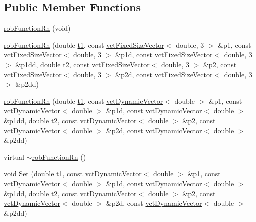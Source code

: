 \subsection*{Public Member Functions}
\begin{DoxyCompactItemize}
\item 
\hyperlink{classrob_function_rn_a44ee7bf0be512aafc162224b1c36e01f}{rob\-Function\-Rn} (void)
\item 
\hyperlink{classrob_function_rn_ac2d173943adbf50617077a352072b8a7}{rob\-Function\-Rn} (double \hyperlink{classrob_function_a9a4b408a3a5a8ae927caec3b6bac36ef}{t1}, const \hyperlink{classvct_fixed_size_vector}{vct\-Fixed\-Size\-Vector}$<$ double, 3 $>$ \&p1, const \hyperlink{classvct_fixed_size_vector}{vct\-Fixed\-Size\-Vector}$<$ double, 3 $>$ \&p1d, const \hyperlink{classvct_fixed_size_vector}{vct\-Fixed\-Size\-Vector}$<$ double, 3 $>$ \&p1dd, double \hyperlink{classrob_function_abf15c2d695ab4cc6336e19862327858f}{t2}, const \hyperlink{classvct_fixed_size_vector}{vct\-Fixed\-Size\-Vector}$<$ double, 3 $>$ \&p2, const \hyperlink{classvct_fixed_size_vector}{vct\-Fixed\-Size\-Vector}$<$ double, 3 $>$ \&p2d, const \hyperlink{classvct_fixed_size_vector}{vct\-Fixed\-Size\-Vector}$<$ double, 3 $>$ \&p2dd)
\item 
\hyperlink{classrob_function_rn_a99dc46624e4e38ac5eb6c27b71f6d821}{rob\-Function\-Rn} (double \hyperlink{classrob_function_a9a4b408a3a5a8ae927caec3b6bac36ef}{t1}, const \hyperlink{classvct_dynamic_vector}{vct\-Dynamic\-Vector}$<$ double $>$ \&p1, const \hyperlink{classvct_dynamic_vector}{vct\-Dynamic\-Vector}$<$ double $>$ \&p1d, const \hyperlink{classvct_dynamic_vector}{vct\-Dynamic\-Vector}$<$ double $>$ \&p1dd, double \hyperlink{classrob_function_abf15c2d695ab4cc6336e19862327858f}{t2}, const \hyperlink{classvct_dynamic_vector}{vct\-Dynamic\-Vector}$<$ double $>$ \&p2, const \hyperlink{classvct_dynamic_vector}{vct\-Dynamic\-Vector}$<$ double $>$ \&p2d, const \hyperlink{classvct_dynamic_vector}{vct\-Dynamic\-Vector}$<$ double $>$ \&p2dd)
\item 
virtual \hyperlink{classrob_function_rn_af8b8ae888a0c3a26afcb3bf2a3d5085f}{$\sim$rob\-Function\-Rn} ()
\item 
void \hyperlink{classrob_function_rn_ad7d1b47734c628597add8ec764f91f47}{Set} (double \hyperlink{classrob_function_a9a4b408a3a5a8ae927caec3b6bac36ef}{t1}, const \hyperlink{classvct_dynamic_vector}{vct\-Dynamic\-Vector}$<$ double $>$ \&p1, const \hyperlink{classvct_dynamic_vector}{vct\-Dynamic\-Vector}$<$ double $>$ \&p1d, const \hyperlink{classvct_dynamic_vector}{vct\-Dynamic\-Vector}$<$ double $>$ \&p1dd, double \hyperlink{classrob_function_abf15c2d695ab4cc6336e19862327858f}{t2}, const \hyperlink{classvct_dynamic_vector}{vct\-Dynamic\-Vector}$<$ double $>$ \&p2, const \hyperlink{classvct_dynamic_vector}{vct\-Dynamic\-Vector}$<$ double $>$ \&p2d, const \hyperlink{classvct_dynamic_vector}{vct\-Dynamic\-Vector}$<$ double $>$ \&p2dd)

\end{DoxyCompactItemize}
